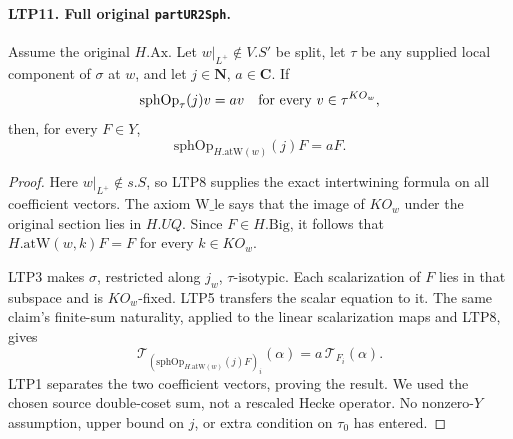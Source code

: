 \paragraph{LTP11. Full original \texttt{partUR2Sph}.}
\label{claim:LTP11}
Assume the original \(H.\mathrm{Ax}\).
Let \(w|_{L^+}\notin V.S'\) be split, let \(\tau\) be any
supplied local component of \(\sigma\) at \(w\), and let
\(j\in\mathbf N\), \(a\in\mathbf C\).  If
\[
       \mathrm{sphOp}_\tau(j)v=av
                      \quad\hbox{for every }v\in\tau^{KO_w},
\]
then, for every \(F\in Y\),
\[
                \mathrm{sphOp}_{H.\mathrm{atW}(w)}(j)F=aF .
\]
\begin{proof}
Here \(w|_{L^+}\notin s.S\), so LTP8 supplies the exact
intertwining formula on all coefficient vectors.  The axiom
\(\mathrm{W\_le}\) says that the image of \(KO_w\) under the
original section lies in \(H.UQ\).  Since \(F\in H.\mathrm{Big}\),
it follows that \(H.\mathrm{atW}(w,k)F=F\) for every \(k\in KO_w\).

LTP3 makes \(\sigma\), restricted along \(j_w\), \(\tau\)-isotypic.
Each scalarization of \(F\) lies in that subspace and is \(KO_w\)-fixed.
LTP5 transfers the scalar equation to it.  The same claim's
finite-sum naturality, applied to the linear scalarization maps
and LTP8, gives
\[
 \mathcal T_{(\mathrm{sphOp}_{H.\mathrm{atW}(w)}(j)F)_i}(\alpha)
                          =a\,\mathcal T_{F_i}(\alpha).
\]
LTP1 separates the two coefficient vectors, proving the result.
We used the chosen source double-coset sum, not a rescaled
Hecke operator.  No nonzero-\(Y\) assumption, upper bound on \(j\),
or extra condition on \(\tau_0\) has entered.
\end{proof}

